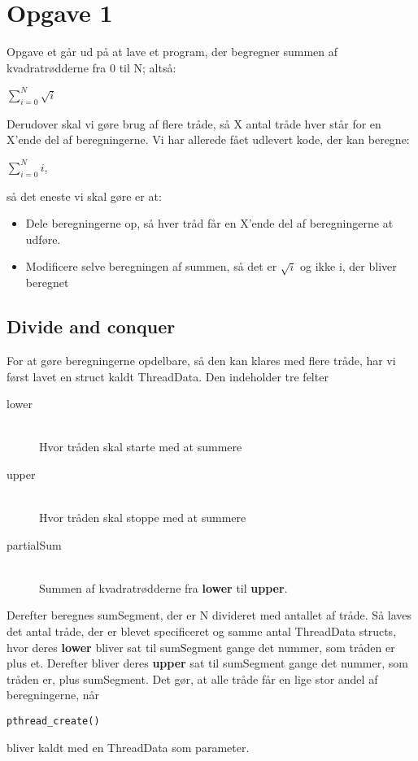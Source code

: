 \section{Opgave 1}
Opgave et går ud på at lave et program, der begregner summen af kvadratrødderne fra 0 til N; altså:
\begin{center}
$\displaystyle\sum_{i=0}^{N} \sqrt{i}$
\end{center}
Derudover skal vi gøre brug af flere tråde, så X antal tråde hver står for en X'ende del af beregningerne. Vi har allerede fået udlevert kode, der kan beregne:

\begin{center}
$\displaystyle\sum_{i=0}^{N} i$,
\end{center}
så det eneste vi skal gøre er at:

\begin{itemize}
\item Dele beregningerne op, så hver tråd får en X'ende del af beregningerne at udføre.
\item Modificere selve beregningen af summen, så det er $\sqrt{i}$ og ikke i, der bliver beregnet
\end{itemize}

\subsection{Divide and conquer}
For at gøre beregningerne opdelbare, så den kan klares med flere tråde, har vi først lavet en struct kaldt ThreadData. Den indeholder tre felter
\begin{description}
\item[lower] \hfill \\ Hvor tråden skal starte med at summere
\item[upper] \hfill \\ Hvor tråden skal stoppe med at summere
\item[partialSum] \hfill \\ Summen af kvadratrødderne fra \textbf{lower} til \textbf{upper}. 
\end{description}

Derefter beregnes sumSegment, der er N divideret med antallet af tråde. Så laves det antal tråde, der er blevet specificeret og samme antal ThreadData structs, hvor deres \textbf{lower} bliver sat til sumSegment gange det nummer, som tråden er plus et. Derefter bliver deres \textbf{upper} sat til sumSegment gange det nummer, som tråden er, plus sumSegment. Det gør, at alle tråde får en lige stor andel af beregningerne, når \begin{verbatim}pthread_create()\end{verbatim} bliver kaldt med en ThreadData som parameter. 

